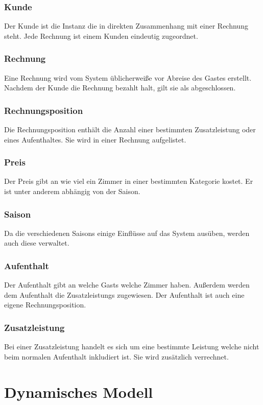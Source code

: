 \documentclass[10pt,a4paper,titlepage]{article}
\begin{document}
\subsubsection{\Gls{Kunde}}
Der \Gls{Kunde} ist die Instanz die in direkten Zusammenhang mit einer Rechnung steht.
Jede \Gls{Rechnung} ist einem \Gls{Kunde}n eindeutig zugeordnet.
\subsubsection{\Gls{Rechnung}}
Eine \Gls{Rechnung} wird vom System üblicherweiße vor Abreise des \Gls{Gast}es erstellt. Nachdem der \Gls{Kunde} die Rechnung bezahlt halt, gilt sie als abgeschlossen.
\subsubsection{Rechnungsposition}
Die Rechnungsposition enthält die Anzahl einer bestimmten \Gls{Zusatzleistung} oder
eines Aufenthaltes. Sie wird in einer \Gls{Rechnung} aufgelistet.
\subsubsection{Preis}
Der Preis gibt an wie viel ein \Gls{Zimmer} in einer bestimmten Kategorie kostet. Er
ist unter anderem abhängig von der \Gls{Saison}.
\subsubsection{\Gls{Saison}}
Da die verschiedenen \Glspl{Saison} einige Einflüsse auf das System ausüben, werden auch diese verwaltet.
\subsubsection{\Gls{Aufenthalt}}
Der \Gls{Aufenthalt} gibt an welche \Glspl{Gast} welche \Gls{Zimmer} haben.
Außerdem werden dem \Gls{Aufenthalt} die \Glspl{Zusatzleistung} zugewiesen. Der \Gls{Aufenthalt} ist auch eine eigene Rechnungsposition.
\subsubsection{\Gls{Zusatzleistung}}
Bei einer \Gls{Zusatzleistung} handelt es sich um eine bestimmte Leistung welche nicht
beim normalen \Gls{Aufenthalt} inkludiert ist. Sie wird zusätzlich verrechnet.

\newpage

\section{Dynamisches Modell}
\end{document}
